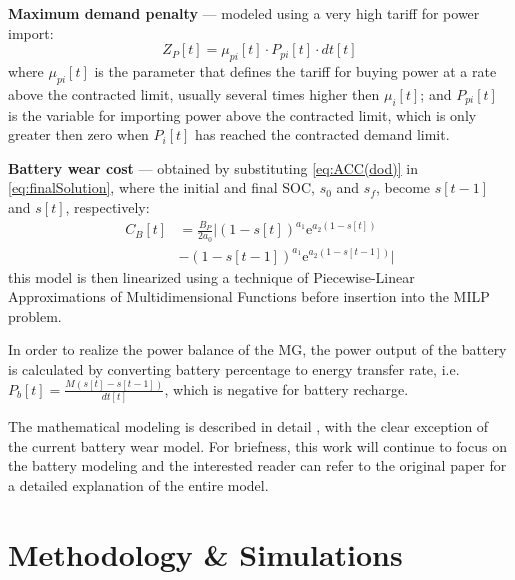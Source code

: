 \documentclass{ieeeaccess}
\begin{document}
    \textbf{Maximum demand penalty} --- modeled using a very high tariff for power import:
    \begin{equation}
        Z_P[t] = \mu_{pi}[t] \cdot P_{pi}[t] \cdot dt[t]
    \end{equation}
    where $\mu_{pi}[t]$ is the parameter that defines the tariff for buying power at a rate above the contracted limit, usually several times higher then $\mu_i[t]$; and $P_{pi}[t]$ is the variable for importing power above the contracted limit, which is only greater then zero when $P_i[t]$ has reached the contracted demand limit.

    \textbf{Battery wear cost} --- obtained by substituting \eqref{eq:ACC(dod)} in \eqref{eq:finalSolution}, where the initial and final \ac{SOC}, $s_0$ and $s_f$, become $s[t-1]$ and $s[t]$, respectively:
    \small
    \begin{equation}
        \begin{aligned}
            C_B[t] & = \frac{B_P}{2a_0} \Bigg|(1-s[t])^{a_1}\mathrm{e}^{a_2(1-s[t])} \\
            & - (1-s[t-1])^{a_1}\mathrm{e}^{a_2(1-s[t-1])} \Bigg|
        \end{aligned}
    	\label{eq:cb[t]_implemented}
    \end{equation}
	\normalsize
	this model is then linearized using a technique of Piecewise-Linear Approximations of Multidimensional Functions before insertion into the \ac{MILP} problem.

    In order to realize the power balance of the \ac{MG}, the power output of the battery is calculated by converting battery percentage to energy transfer rate, i.e. $P_b[t] = \frac{M(s[t]-s[t-1])}{dt[t]}$, which is negative for battery recharge.

    The mathematical modeling is described in detail \cite{SANTOS2018}, with the clear exception of the current battery wear model. For briefness, this work will continue to focus on the battery modeling and the interested reader can refer to the original paper for a detailed explanation of the entire model.

    \section{Methodology \& Simulations}
\end{document}
